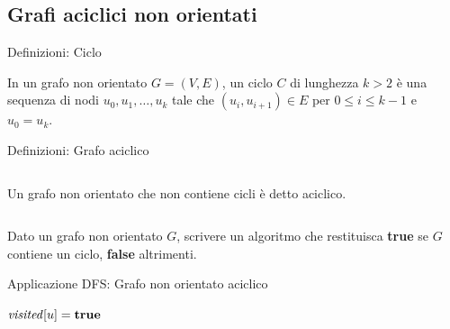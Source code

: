 \subsection{Grafi aciclici non orientati}

\begin{frame}{Definizioni: Ciclo}
	
\vspace{-9pt}
\begin{myboxtitle}
In un grafo non orientato $G=(V,E)$, un \alert{ciclo} $C$ di lunghezza $k > 2$ è una sequenza di nodi $u_0, u_1, \ldots, u_k$ tale che $(u_i, u_{i+1}) \in E$ per $0 \leq i \leq k-1$ e $u_0 = u_k$.
\end{myboxtitle}


\end{frame}


\begin{frame}{Definizioni: Grafo aciclico}

\vspace{-9pt}
\begin{columns}[T]

\begin{myboxtitle}
Un grafo non orientato che non contiene cicli è detto \alert{aciclico}.
\end{myboxtitle}
\vspace{-12pt}
\end{columns}

\bigskip
\begin{myboxtitle}[Problema]
Dato un grafo non orientato $G$, scrivere un algoritmo che restituisca \textbf{true} se $G$ contiene un ciclo, \textbf{false}
altrimenti.
\end{myboxtitle}

\end{frame}

\begin{frame}[shrink=10]{Applicazione DFS: Grafo non orientato aciclico}

\large
\begin{Procedure}
\caption[A]{$\BOOLEAN\ \fontproc{hasCycleRec}(\Graph\ G,\ \Node\ u, \Node\ p, \BOOLEAN[\,]\ \mmark)$}

$\mmark[u] = \TRUE$\;
{
  \uIf{$\mmark[v]$}
  {
    \Return \TRUE\;
  }
  {
    \Return \TRUE\;
  }
}
\Return \FALSE\;
\end{Procedure}

\end{frame}

